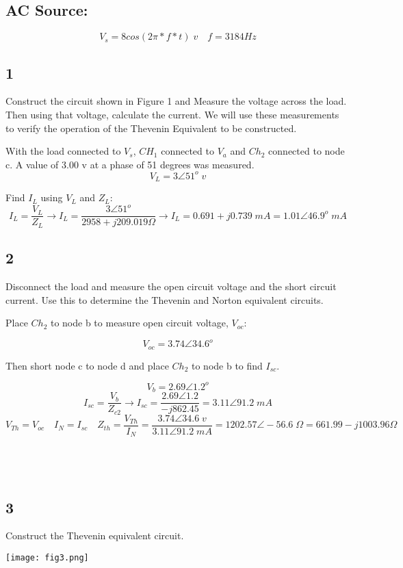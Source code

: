 \documentclass[11pt]{article}
\begin{document}
\subsection*{AC Source:}
$$V_s = 8cos(2\pi*f*t)\;v \quad f = 3184 Hz$$

\subsection*{1}
Construct the circuit shown in Figure 1 and Measure the voltage across the load. Then using that voltage, calculate the current. We will use these measurements to verify the operation of the Thevenin Equivalent to be constructed.

With the load connected to $V_s$, $CH_1$ connected to $V_a$ and $Ch_2$ connected to node c. A value of 3.00 v at a phase of 51 degrees was measured.
$$V_L = 3 \angle 51^o\;v$$

Find $I_L$ using $V_L$ and $Z_L$:
$$I_L = \frac{V_L}{Z_L} \rightarrow I_L = \frac{3\angle51^o}{2958 + j209.019\Omega} \rightarrow I_L = 0.691 +j0.739\;mA = 1.01\angle46.9^o\;mA$$


\subsection*{2}
Disconnect the load and measure the open circuit voltage and the short circuit current. Use this to determine the Thevenin and Norton equivalent circuits.

Place $Ch_2$ to node b to measure open circuit voltage, $V_{oc}$:

$$V_{oc} = 3.74 \angle34.6^o$$

Then short node c to node d and place $Ch_2$ to node b to find $I_{sc}$.

$$V_b = 2.69\angle1.2^o$$
$$I_{sc} = \frac{V_b}{Z_{c2}} \rightarrow I_{sc} = \frac{2.69\angle 1.2}{-j862.45}=3.11\angle91.2\;mA$$
$$V_{Th} = V_{oc} \quad I_N=I_{sc} \quad Z_{th} = \frac{V_{Th}}{I_N} = \frac{3.74\angle34.6\;v}{3.11\angle{91.2}\;mA} = 1202.57 \angle-56.6\;\Omega = 661.99 - j1003.96 \Omega$$
\\
\\
\\
\subsection*{3}
Construct the Thevenin equivalent circuit.
\begin{center}
    \texttt{[image: fig3.png]}
\end{center}
\end{document}
